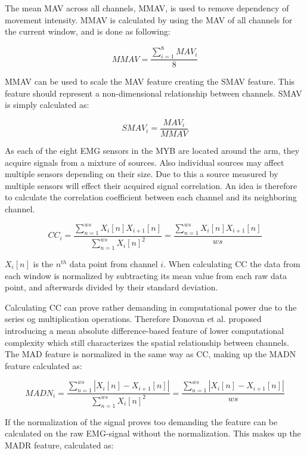 The mean MAV across all channels, MMAV, is used to remove dependency of movement intensity. MMAV is calculated by using the MAV of all channels for the current window, and is done as following: 

\begin{equation} \label{eq:MMAV}
MMAV=\frac{\sum_{i=1}^{8}MAV_i}{8}
\end{equation}

MMAV can be used to scale the MAV feature creating the SMAV feature. This feature should represent a non-dimensional relationship between channels. SMAV is simply calculated as:

\begin{equation} \label{eq:SMAV}
SMAV_i=\frac{MAV_i}{MMAV}
\end{equation}

As each of the eight EMG sensors in the MYB are located around the arm, they acquire signals from a mixture of sources. Also individual sources may affect multiple sensors depending on their size. Due to this a source measured by multiple sensors will effect their acquired signal correlation. An idea is therefore to calculate the correlation coefficient between each channel and its neighboring channel.  

\begin{equation} \label{eq:CC}
CC_i=\frac{\sum_{n=1}^{ws}X_i[n]X_{i+1}[n]}{\sum_{n=1}^{ws}X_i[n]^2}=\frac{\sum_{n=1}^{ws}X_i[n]X_{i+1}[n]}{ws}
\end{equation}

$X_i[n]$ is the $n^{th}$ data point from channel $i$. When calculating CC the data from each window is normalized by subtracting its mean value from each raw data point, and afterwards divided by their standard deviation. 

Calculating CC can prove rather demanding in computational power due to the series og multiplication operations. Therefore Donovan et al. \cite{Donovan2017} proposed introducing a mean absolute difference-based feature of lower computational complexity which still characterizes the spatial relationship between channels. The MAD feature is normalized in the same way as CC, making up the MADN feature calculated as: 

\begin{equation} \label{eq:MADN}
MADN_i=\frac{\sum_{n=1}^{ws}|X_i[n]-X_{i+1}[n]|}{\sum_{n=1}^{ws}X_i[n]^2}=\frac{\sum_{n=1}^{ws}|X_i[n]-X_{i+1}[n]|}{ws}
\end{equation}

If the normalization of the signal proves too demanding the feature can be calculated on the raw EMG-signal without the normalization. This makes up the MADR feature, calculated as:

